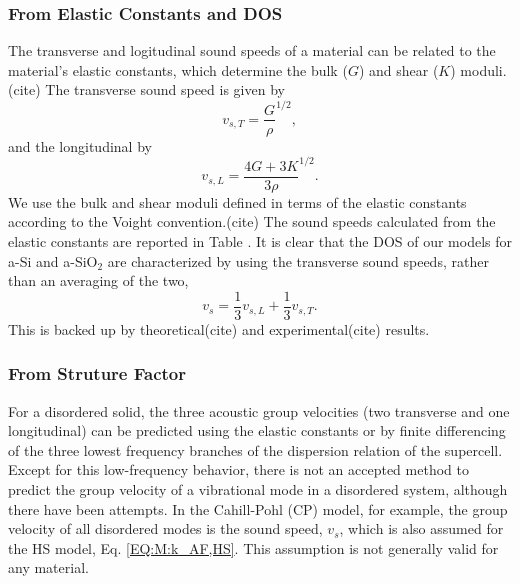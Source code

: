 \documentclass[aps,prb,twocolumn,superscriptaddress,footinbib,amsmath,amssymb,floatfix]{revtex4}
\begin{document}
\subsubsection{\label{S:Structure}From Elastic Constants and DOS}

The transverse and logitudinal sound speeds of a material can be related 
to the material's elastic constants, which determine the bulk ($G$) and 
shear ($K$) moduli.(cite) The transverse sound speed is given by 
\begin{equation}\label{EQ:Dynamical}
v_{s,T} = \frac{G}{\rho}^{1/2},
\end{equation}
and the longitudinal by
\begin{equation}\label{EQ:Dynamical}
v_{s,L} = \frac{4G + 3K}{3\rho}^{1/2}.
\end{equation}
We use the bulk and shear moduli defined in terms of the elastic 
constants according to the Voight convention.(cite) 
The sound speeds calculated from the 
elastic constants are reported in Table . It is clear that the DOS of 
our models for a-Si and a-SiO$_2$ are characterized by using the 
transverse sound speeds, rather than an averaging of the two, 
\begin{equation}\label{EQ:Dynamical}
v_{s} = \frac{1}{3}v_{s,L} + \frac{1}{3}v_{s,T}. 
\end{equation}
This is backed up by theoretical(cite) and experimental(cite) results. 



\subsubsection{\label{S:Structure}From Struture Factor}

For a disordered solid, the three acoustic group 
velocities (two transverse and one 
longitudinal) can be predicted using the elastic constants
\cite{gale_general_2003} 
or by finite differencing of the three lowest frequency branches 
of the dispersion relation of the supercell.
\cite{he_thermal_2011,he_heat_2011} 
Except for this low-frequency behavior, there is not an 
accepted method to predict the group velocity of a 
vibrational mode in a disordered system, although there have been 
attempts.
\cite{cahill_lattice_1988,duda_reducing_2011,donadio_atomistic_2009,
he_heat_2011,he_thermal_2011} 
In the Cahill-Pohl (CP) model, for example, the group velocity of 
all disordered modes is the sound speed, $v_s$, which is also assumed  
for the HS model, Eq. \eqref{EQ:M:k_AF,HS}.
\cite{cahill_lattice_1988} This assumption is not generally valid  
for any material.\cite{feldman_numerical_1999,duda_reducing_2011,
donadio_atomistic_2009,he_heat_2011,he_thermal_2011}
\end{document}
